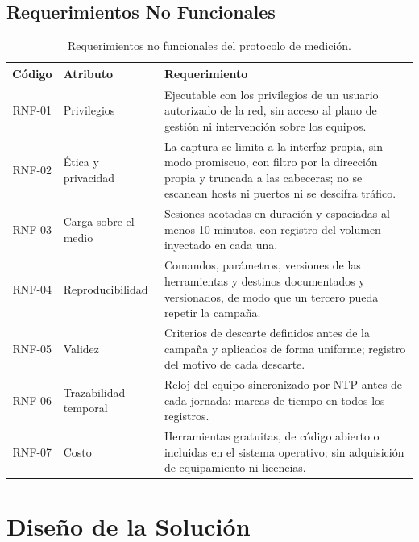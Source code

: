 \subsection{Requerimientos No Funcionales}

\begin{table}[htbp]
  \centering
  \caption{Requerimientos no funcionales del protocolo de medición.}
  \label{tab:req_no_funcionales}
  \footnotesize
  \renewcommand{\arraystretch}{1.25}
  \begin{tabularx}{\textwidth}{|c|p{3.1cm}|>{\raggedright\arraybackslash}X|}
    \hline
    \textbf{Código} & \textbf{Atributo} & \textbf{Requerimiento} \\
    \hline
    RNF-01 & Privilegios & Ejecutable con los privilegios de un usuario autorizado de la red, sin acceso al plano de gestión ni intervención sobre los equipos. \\
    \hline
    RNF-02 & Ética y privacidad & La captura se limita a la interfaz propia, sin modo promiscuo, con filtro por la dirección propia y truncada a las cabeceras; no se escanean hosts ni puertos ni se descifra tráfico. \\
    \hline
    RNF-03 & Carga sobre el medio & Sesiones acotadas en duración y espaciadas al menos 10 minutos, con registro del volumen inyectado en cada una. \\
    \hline
    RNF-04 & Reproducibilidad & Comandos, parámetros, versiones de las herramientas y destinos documentados y versionados, de modo que un tercero pueda repetir la campaña. \\
    \hline
    RNF-05 & Validez & Criterios de descarte definidos antes de la campaña y aplicados de forma uniforme; registro del motivo de cada descarte. \\
    \hline
    RNF-06 & Trazabilidad temporal & Reloj del equipo sincronizado por NTP antes de cada jornada; marcas de tiempo en todos los registros. \\
    \hline
    RNF-07 & Costo & Herramientas gratuitas, de código abierto o incluidas en el sistema operativo; sin adquisición de equipamiento ni licencias. \\
    \hline
  \end{tabularx}
  \vspace{2pt}
  \raggedright
\end{table}

\section{Diseño de la Solución}
\label{sec:diseno_solucion}

